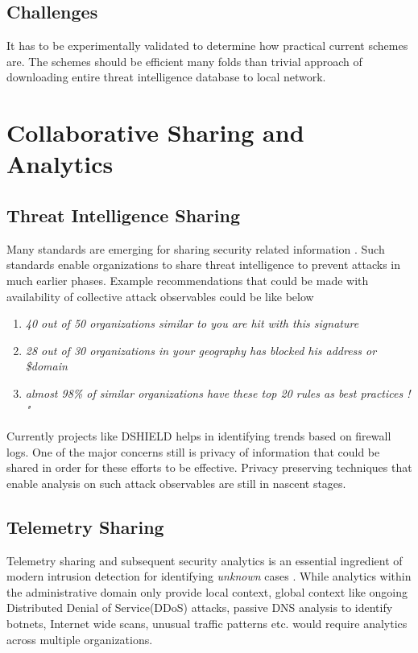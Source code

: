 \documentclass[runningheads,a4paper]{llncs}
\begin{document}
\subsection{Challenges}
It has to be experimentally validated to determine how practical current schemes are. The schemes should be efficient many folds than trivial approach of downloading entire threat intelligence database to local network.


\section{Collaborative Sharing and Analytics}
\subsection{Threat Intelligence Sharing}
Many standards are emerging for sharing security related information \cite{mitre}.  Such standards enable organizations to share threat intelligence to prevent attacks in much earlier phases.
Example recommendations that could be made with availability of collective attack observables could be like below

\begin{enumerate}
\item  \emph{40 out of 50 organizations similar to you are hit with this signature}
\item \emph{28 out of 30 organizations in your geography has blocked his \ip address or \$domain }\item \emph {almost 98\% of similar organizations have these top 20 rules as best practices ! " }
\end{enumerate}
Currently projects like DSHIELD helps in identifying trends based on firewall logs.  One of the major concerns still is privacy of information that could be shared in order for these efforts to be effective.  Privacy preserving techniques that enable analysis on such attack observables are still in nascent stages. 

\subsection{Telemetry Sharing}
Telemetry sharing and subsequent security analytics is an essential ingredient of modern intrusion detection for identifying \emph{unknown} cases \cite{bd}. While analytics within the administrative domain only provide local context, global context like ongoing Distributed Denial of Service(DDoS) attacks, passive DNS analysis to identify botnets, Internet wide scans, unusual traffic patterns etc. would require analytics across multiple organizations. 
\end{document}
